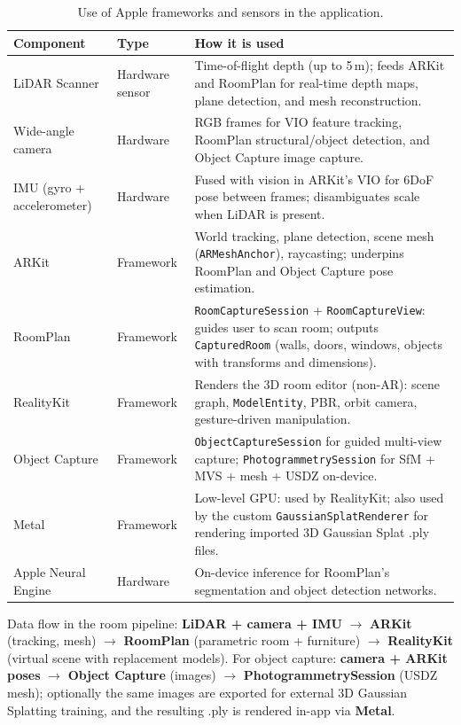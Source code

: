 \begin{table}[h]
\centering
\caption{Use of Apple frameworks and sensors in the application.}
\label{tab:apple_kit_sensors}
\begin{tabular}{|l|l|p{6.2cm}|}
\hline
\textbf{Component} & \textbf{Type} & \textbf{How it is used} \\
\hline
LiDAR Scanner & Hardware sensor & Time-of-flight depth (up to 5\,m); feeds ARKit and RoomPlan for real-time depth maps, plane detection, and mesh reconstruction. \\
Wide-angle camera & Hardware & RGB frames for VIO feature tracking, RoomPlan structural/object detection, and Object Capture image capture. \\
IMU (gyro + accelerometer) & Hardware & Fused with vision in ARKit's VIO for 6DoF pose between frames; disambiguates scale when LiDAR is present. \\
ARKit & Framework & World tracking, plane detection, scene mesh (\texttt{ARMeshAnchor}), raycasting; underpins RoomPlan and Object Capture pose estimation. \\
RoomPlan & Framework & \texttt{RoomCaptureSession} + \texttt{RoomCaptureView}: guides user to scan room; outputs \texttt{CapturedRoom} (walls, doors, windows, objects with transforms and dimensions). \\
RealityKit & Framework & Renders the 3D room editor (non-AR): scene graph, \texttt{ModelEntity}, PBR, orbit camera, gesture-driven manipulation. \\
Object Capture & Framework & \texttt{ObjectCaptureSession} for guided multi-view capture; \texttt{PhotogrammetrySession} for SfM + MVS + mesh + USDZ on-device. \\
Metal & Framework & Low-level GPU: used by RealityKit; also used by the custom \texttt{GaussianSplatRenderer} for rendering imported 3D Gaussian Splat .ply files. \\
Apple Neural Engine & Hardware & On-device inference for RoomPlan's segmentation and object detection networks. \\
\hline
\end{tabular}
\end{table}

Data flow in the room pipeline: \textbf{LiDAR + camera + IMU} $\rightarrow$ \textbf{ARKit} (tracking, mesh) $\rightarrow$ \textbf{RoomPlan} (parametric room + furniture) $\rightarrow$ \textbf{RealityKit} (virtual scene with replacement models). For object capture: \textbf{camera + ARKit poses} $\rightarrow$ \textbf{Object Capture} (images) $\rightarrow$ \textbf{PhotogrammetrySession} (USDZ mesh); optionally the same images are exported for external 3D Gaussian Splatting training, and the resulting .ply is rendered in-app via \textbf{Metal}.


